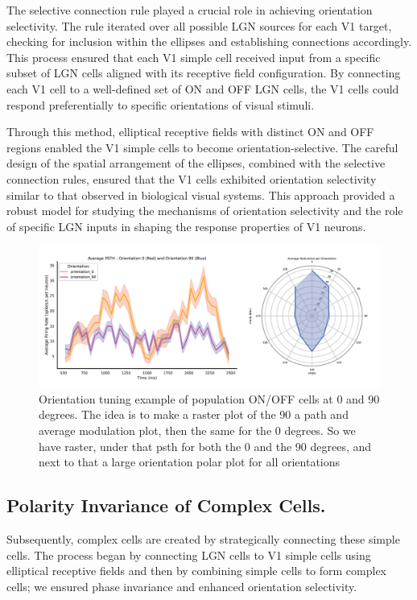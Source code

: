 \documentclass[12pt]{article}
\begin{document}
The selective connection rule played a crucial role in achieving orientation selectivity. The rule iterated over all possible LGN sources for each V1 target, checking for inclusion within the ellipses and establishing connections accordingly. This process ensured that each V1 simple cell received input from a specific subset of LGN cells aligned with its receptive field configuration. By connecting each V1 cell to a well-defined set of ON and OFF LGN cells, the V1 cells could respond preferentially to specific orientations of visual stimuli.

Through this method, elliptical receptive fields with distinct ON and OFF regions enabled the V1 simple cells to become orientation-selective. The careful design of the spatial arrangement of the ellipses, combined with the selective connection rules, ensured that the V1 cells exhibited orientation selectivity similar to that observed in biological visual systems. This approach provided a robust model for studying the mechanisms of orientation selectivity and the role of specific LGN inputs in shaping the response properties of V1 neurons.

\begin{figure}[htbp!]
    \centering
    \includegraphics[width=1 \textwidth]{figures/figure_simple_orientation_tuning.png}
    \caption{Orientation tuning example of population ON/OFF cells at 0 and 90 degrees. The idea is to make a raster plot of the 90 a path and average modulation plot, then the same for the 0 degrees. So we have raster, under that psth  for both the 0 and the 90 degrees, and next to that a large orientation polar plot for all orientations}
    \label{fig:simple cell orientation tuning}
\end{figure}

\subsection{Polarity Invariance of Complex Cells.}
Subsequently, complex cells are created by strategically connecting these simple cells. The process began by connecting LGN cells to V1 simple cells using elliptical receptive fields and then by combining simple cells to form complex cells; we ensured phase invariance and enhanced orientation selectivity.
\end{document}
